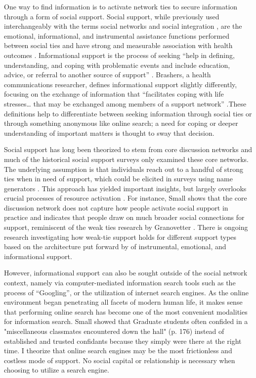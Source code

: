 One way to find information is to activate network ties to secure information
through a form of social support. Social support, while previously used
interchangeably with the terms social networks and social integration
\citep{houseStructuresProcessesSocial1988}, are the emotional, informational,
and instrumental assistance functions performed between social ties and have
strong and measurable association with health outcomes
\citep{houseMeasuresConceptsSocial1985, thoitsMechanismsLinkingSocial2011}.
Informational support is the process of seeking “help in defining,
understanding, and coping with problematic events and include education, advice,
or referral to another source of support” \citep[][p. 640]{winemiller_etal93}.
Brashers, a health communications researcher, defines informational support
slightly differently, focusing on the exchange of information that “facilitates
coping with life stresses… that may be exchanged among members of a support
network” \citet[][p. 260]{brashersInformationSeekingAvoiding2002}.These
definitions help to differentiate between seeking information through social
ties or through something anonymous like online search; a need for coping or
deeper understanding of important matters is thought to sway that decision.

Social support has long been theorized to stem from core discussion networks and
much of the historical social support surveys only examined these core networks.
The underlying assumption is that individuals reach out to a handful of strong
ties when in need of support, which could be elicited in surveys using name
generators \citep{marsdenCoreDiscussionNetworks1987}. This approach has yielded
important insights, but largely overlooks crucial processes of resource
activation \citep{hurlbertCoreNetworksTie2000, perrySocialNetworkActivation2015,
smithDonPutMy2005}. For instance, Small \citet{smallSomeoneTalk2017} shows that
the core discussion network does not capture how people activate social support
in practice and indicates that people draw on much broader social connections
for support, reminiscent of the weak ties research by Granovetter
\citet{granovetterStrengthWeakTies1973}. There is ongoing research investigating
how weak-tie support holds for different support types based on the architecture
put forward by \citet{houseStructuresProcessesSocial1988} of instrumental,
emotional, and informational support.

However, informational support can also be sought outside of the social network
context, namely via computer-mediated information search tools such as the
process of “Googling”, or the utilization of internet search engines. As the
online environment began penetrating all facets of modern human life, it makes
sense that performing online search has become one of the most convenient
modalities for information search. Small \citet{smallSomeoneTalk2017} showed
that Graduate students often confided in a "miscellaneous classmates encountered
down the hall" (p. 176) instead of established and trusted confidants because
they simply were there at the right time. I theorize that online search engines
may be the most frictionless and costless mode of support. No social capital or
relationship is necessary when choosing to utilize a search engine.

